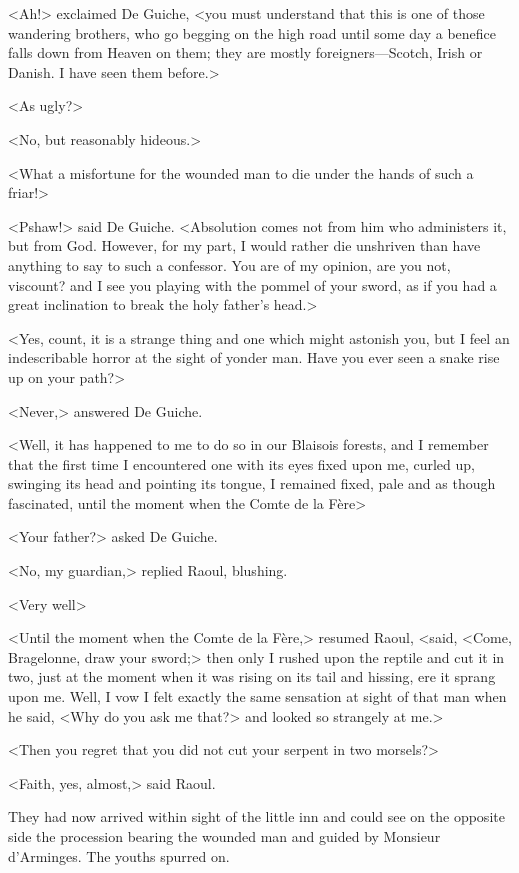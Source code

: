<Ah!> exclaimed De Guiche, <you must understand that this is one of those wandering brothers, who go begging on the high road until some day a benefice falls down from Heaven on them; they are mostly foreigners—Scotch, Irish or Danish. I have seen them before.>

<As ugly?>

<No, but reasonably hideous.>

<What a misfortune for the wounded man to die under the hands of such a friar!>

<Pshaw!> said De Guiche. <Absolution comes not from him who administers it, but from God. However, for my part, I would rather die unshriven than have anything to say to such a confessor. You are of my opinion, are you not, viscount? and I see you playing with the pommel of your sword, as if you had a great inclination to break the holy father's head.>

<Yes, count, it is a strange thing and one which might astonish you, but I feel an indescribable horror at the sight of yonder man. Have you ever seen a snake rise up on your path?>

<Never,> answered De Guiche.

<Well, it has happened to me to do so in our Blaisois forests, and I remember that the first time I encountered one with its eyes fixed upon me, curled up, swinging its head and pointing its tongue, I remained fixed, pale and as though fascinated, until the moment when the Comte de la Fère\longdash>

<Your father?> asked De Guiche.

<No, my guardian,> replied Raoul, blushing.

<Very well\longdash>

<Until the moment when the Comte de la Fère,> resumed Raoul, <said, <Come, Bragelonne, draw your sword;> then only I rushed upon the reptile and cut it in two, just at the moment when it was rising on its tail and hissing, ere it sprang upon me. Well, I vow I felt exactly the same sensation at sight of that man when he said, <Why do you ask me that?> and looked so strangely at me.>

<Then you regret that you did not cut your serpent in two morsels?>

<Faith, yes, almost,> said Raoul.

They had now arrived within sight of the little inn and could see on the opposite side the procession bearing the wounded man and guided by Monsieur d'Arminges. The youths spurred on.

